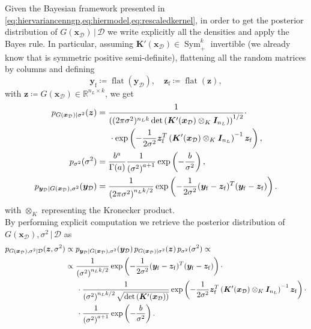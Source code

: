 \documentclass[a4paper, 11pt, reqno]{amsart}
\theoremstyle{plain}
\theoremstyle{remark}
\theoremstyle{definition}
\newcommand{\given}{\, | \,}
\newcommand{\real}{\mathbb{R}}
\renewcommand{\exp}[1]{\operatorname{exp}\left(#1\right)}
\renewcommand{\det}[1]{\operatorname{det}\left(#1\right)}
\newcommand{\flatten}[1]{\operatorname{flat}\left(#1\right)}
\newcommand{\blankeq}{\kern14.65pt}
\newcommand{\train}{\mathcal{D}}
\begin{document}
Given the Bayesian framework presented in \cref{eq:hiervariancenngp,eq:hiermodel,eq:rescaledkernel}, in order to get the posterior distribution of $G(\bm{x}_{\mathcal{D}}) \given \train$ we write explicitly all the densities and apply the Bayes rule. 
In particular, assuming $\bm{K}'(\bm{x}_{\mathcal{D}}) \in \operatorname{Sym}_+^{k}$ invertible (we already know that is symmetric positive semi-definite), flattening all the random matrices by columns and defining
\begin{equation*}
	\bm{y}_{\mathrm{f}} \coloneqq \flatten{\bm{y}_{\mathcal{D}}}, \quad \bm{z}_{\mathrm{f}} \coloneqq \flatten{\bm{z}},
\end{equation*}
with $\bm{z} \coloneqq G(\bm{x}_{\mathcal{D}}) \in \real^{n_L \times k}$, we get
\begin{equation*}
	\begin{aligned}	
		p_{G(\bm{x}_{\mathcal{D}}) | \sigma^2}(\bm{z}) & = \frac{1}{\left((2\pi \sigma^2)^{n_L k} \det{\bm{K}'(\bm{x}_{\mathcal{D}}) \otimes_K \bm{I}_{n_L}}\right)^{1/2}} \cdot \\
		& \blankeq \cdot \exp{-\frac{1}{2\sigma^2} \bm{z}_{\mathrm{f}}^T \left(\bm{K}'(\bm{x}_{\mathcal{D}}) \otimes_K \bm{I}_{n_L}\right)^{-1} \bm{z}_{\mathrm{f}}}, \\
		p_{\sigma^2}(\sigma^2) & = \frac{b^a}{\Gamma(a)} \frac{1}{\left(\sigma^2\right)^{a + 1}} \exp{-\frac{b}{\sigma^2}}, \\
		p_{\bm{y}_{\mathcal{D}} | G(\bm{x}_{\mathcal{D}}), \sigma^2}(\bm{y}_{\mathcal{D}}) &= \frac{1}{\left(2\pi\sigma^2\right)^{n_L k / 2}} \exp{-\frac{1}{2 \sigma^2} (\bm{y}_{\mathrm{f}} - \bm{z}_{\mathrm{f}})^T (\bm{y}_{\mathrm{f}} - \bm{z}_{\mathrm{f}})}.
	\end{aligned}
\end{equation*}
with $\otimes_K$ representing the Kronecker product. \\
By performing explicit computation we retrieve the posterior distribution of $G(\bm{x}_{\mathcal{D}}), \sigma^2 \given \train$ as
\begin{equation*}
	\begin{aligned}
		p_{G(\bm{x}_{\mathcal{D}}), \sigma^2 | \train}(\bm{z}, \sigma^2) & \propto p_{\bm{y}_{\mathcal{D}} | G(\bm{x}_{\mathcal{D}}), \sigma^2}(\bm{y}_{\mathcal{D}}) \, p_{G(\bm{x}_{\mathcal{D}}) | \sigma^2}(\bm{z}) \, p_{\sigma^2}(\sigma^2) \propto \\
		& \propto \frac{1}{\left(\sigma^2\right)^{n_L k / 2}} \exp{-\frac{1}{2\sigma^2} (\bm{y}_{\mathrm{f}} - \bm{z}_{\mathrm{f}})^T (\bm{y}_{\mathrm{f}} - \bm{z}_{\mathrm{f}})} \cdot \\
		& \blankeq \cdot \frac{1}{\left(\sigma^2\right)^{n_L k / 2} \sqrt{\det{\bm{K}'(\bm{x}_{\mathcal{D}})}}} \exp{-\frac{1}{2 \sigma^2} \bm{z}_{\mathrm{f}}^T \left(\bm{K}'(\bm{x}_{\mathcal{D}}) \otimes_K \bm{I}_{n_L}\right)^{-1} \bm{z}_{\mathrm{f}}} \cdot \\
		& \blankeq \cdot \frac{1}{\left(\sigma^2\right)^{a + 1}} \exp{-\frac{b}{\sigma^2}}.
	\end{aligned}
\end{equation*}
\end{document}

